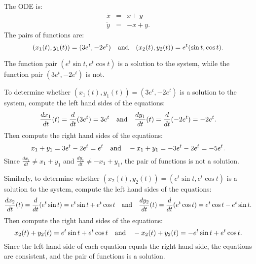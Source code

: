 \documentclass{ximera}
\begin{document}
\begin{computerExercise} \label{c3.5.5c}
The ODE is:
\begin{eqnarray*}
\dot{x} & = &  x + y \\
\dot{y} & = & -x + y.
\end{eqnarray*}
The pairs of functions are:
\[
(x_1(t),y_1(t)) =  (3e^t, -2e^t) \quad\mbox{and}\quad (x_2(t),y_2(t)) = e^t(\sin t,\cos t).
\]

\begin{solution}
\ans The function pair $(e^t\sin{t},e^t\cos{t})$ is a
solution to the system, while the function pair $(3e^t,-2e^t)$ is not.

\soln To determine whether $(x_1(t),y_1(t)) = (3e^t,-2e^t)$ is
a solution to the system, compute the left hand sides of the equations:
\[
\frac{dx_1}{dt}(t) = \frac{d}{dt}(3e^t) = 3e^t \quad\mbox{and}\quad
\frac{dy_1}{dt}(t) = \frac{d}{dt}(-2e^t) = -2e^t.
\]
Then compute the right hand sides of the equations:
\[
x_1 + y_1 = 3e^t - 2e^t = e^t \quad\mbox{and}\quad
-x_1 + y_1 = -3e^t - 2e^t = -5e^t.
\]
Since $\frac{dx_1}{dt} \neq x_1 + y_1$ and $\frac{dy_1}{dt} \neq -x_1 + y_1$,
the pair of functions is not a solution.

\para Similarly, to determine whether $(x_2(t),y_2(t)) =
(e^t\sin{t},e^t\cos{t})$ is a solution to the system, compute the left
hand sides of the equations:
\[
\frac{dx_2}{dt}(t) = \frac{d}{dt}(e^t\sin{t}) = 
e^t\sin{t} + e^t\cos{t} \quad\mbox{and}\quad
\frac{dy_2}{dt}(t) = \frac{d}{dt}(e^t\cos{t}) =
e^t\cos{t} - e^t\sin{t}.
\]
Then compute the right hand sides of the equations:
\[
x_2(t) + y_2(t) = e^t\sin{t} + e^t\cos{t} \quad\mbox{and}\quad
-x_2(t) + y_2(t) = -e^t\sin{t} + e^t\cos{t}.
\]
Since the left hand side of each equation equals the right hand side, the
equations are consistent, and the pair of functions is a solution.


\end{solution}
\end{computerExercise}
\end{document}
